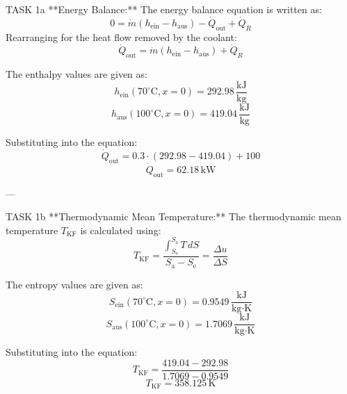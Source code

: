 TASK 1a  
**Energy Balance:**  
The energy balance equation is written as:  
\[
0 = \dot{m} (h_{\text{ein}} - h_{\text{aus}}) - \dot{Q}_{\text{out}} + \dot{Q}_R
\]  
Rearranging for the heat flow removed by the coolant:  
\[
\dot{Q}_{\text{out}} = \dot{m} (h_{\text{ein}} - h_{\text{aus}}) + \dot{Q}_R
\]  

The enthalpy values are given as:  
\[
h_{\text{ein}} (70^\circ\text{C}, x = 0) = 292.98 \, \frac{\text{kJ}}{\text{kg}}
\]  
\[
h_{\text{aus}} (100^\circ\text{C}, x = 0) = 419.04 \, \frac{\text{kJ}}{\text{kg}}
\]  

Substituting into the equation:  
\[
\dot{Q}_{\text{out}} = 0.3 \cdot (292.98 - 419.04) + 100
\]  
\[
\dot{Q}_{\text{out}} = 62.18 \, \text{kW}
\]  

---

TASK 1b  
**Thermodynamic Mean Temperature:**  
The thermodynamic mean temperature \( T_{\text{KF}} \) is calculated using:  
\[
T_{\text{KF}} = \frac{\int_{S_{\text{e}}}^{S_{\text{a}}} T \, dS}{S_{\text{a}} - S_{\text{e}}} = \frac{\Delta u}{\Delta S}
\]  

The entropy values are given as:  
\[
S_{\text{ein}} (70^\circ\text{C}, x = 0) = 0.9549 \, \frac{\text{kJ}}{\text{kg·K}}
\]  
\[
S_{\text{aus}} (100^\circ\text{C}, x = 0) = 1.7069 \, \frac{\text{kJ}}{\text{kg·K}}
\]  

Substituting into the equation:  
\[
T_{\text{KF}} = \frac{419.04 - 292.98}{1.7069 - 0.9549}
\]  
\[
T_{\text{KF}} = 358.125 \, \text{K}
\]